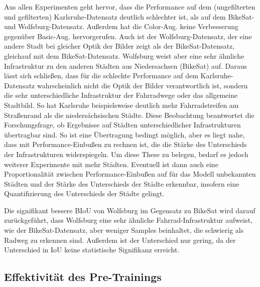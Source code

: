 Aus allen Experimenten geht hervor, dass die Performance auf dem (ungefilterten und gefilterten) Karlsruhe-Datensatz deutlich schlechter ist, 
als auf dem BikeSat- und Wolfsburg-Datensatz. Außerdem hat die Color-Aug. keine Verbesserung gegenüber 
Basic-Aug. hervorgerufen. Auch ist der Wolfsburg-Datensatz, der eine andere Stadt bei gleicher Optik der Bilder 
zeigt als der BikeSat-Datensatz, gleichauf mit dem BikeSat-Datensatz. Wolfsburg weist aber eine sehr ähnliche 
Infrastruktur zu den anderen Städten aus Niedersachsen (BikeSat) auf. Daraus lässt sich schließen, 
dass für die schlechte Performance auf dem Karlsruhe-Datensatz wahrscheinlich nicht die Optik der Bilder verantwortlich 
ist, sondern die sehr unterschiedliche Infrastruktur der Fahrradwege oder das allgemeine Stadtbild. 
So hat Karlsruhe beispielsweise deutlich mehr Fahrradstreifen am Straßenrand als die niedersächsischen Städte. 
Diese Beobachtung beantwortet die Forschungsfrage, ob Ergebnisse auf Städten unterschiedlicher Infrastrukturen 
übertragbar sind. So ist eine Übertragung bedingt möglich, aber es liegt nahe, dass mit Performance-Einbußen zu rechnen ist, 
die die Stärke des Unterschieds der Infrastrukturen widerspiegeln. 
Um diese These zu belegen, bedarf es jedoch weiterer Experimente mit mehr Städten. Eventuell ist dann 
auch eine Proportionalität zwischen Performance-Einbußen auf für das Modell unbekannten Städten und der Stärke 
des Unterschieds der Städte erkennbar, insofern eine Quantifizierung des Unterschieds der Städte gelingt. 

Die signifikant bessere BIoU von Wolfsburg im Gegensatz zu BikeSat wird darauf zurückgeführt, dass 
Wolfsburg eine sehr ähnliche Fahrrad-Infrastruktur aufweist, wie der BikeSat-Datensatz, aber weniger 
Samples beinhaltet, die schwierig als Radweg zu erkennen sind. Außerdem ist der Unterschied nur gering, 
da der Unterschied in IoU keine statistische Signifikanz erreicht. 


\subsection{Effektivität des Pre-Trainings}


